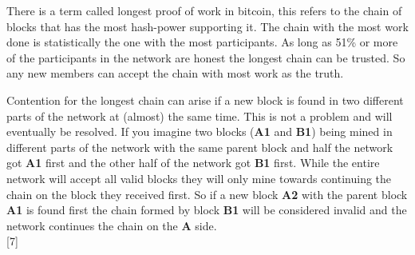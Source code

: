 There is a term called longest proof of work in bitcoin, this refers to the chain of blocks that has the most hash-power supporting it. The chain with the most work done is statistically the one with the most participants. As long as 51\% or more of the participants in the network are honest the longest chain can be trusted. So any new members can accept the chain with most work as the truth. 


Contention for the longest chain can arise if a new block is found in two different parts of the network at (almost) the same time. This is not a problem and will eventually be resolved. If you imagine two blocks (\textbf{A1} and \textbf{B1}) being mined in different parts of the network with the same parent block and half the network got \textbf{A1} first and the other half of the network got \textbf{B1} first. While the entire network will accept all valid blocks they will only mine towards continuing the chain on the block they received first. So if a new block \textbf{A2} with the parent block \textbf{A1} is found first the chain formed by block \textbf{B1} will be considered invalid and the network continues the chain on the \textbf{A} side.\\

[7]


